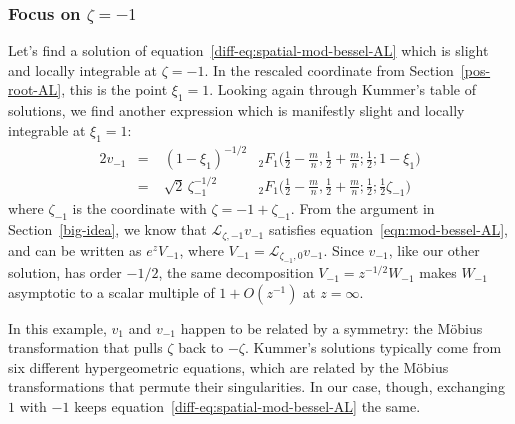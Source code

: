 \documentclass{article}
\theoremstyle{definition}
\newcommand{\laplace}{\mathcal{L}}
\begin{document}
\subsubsection{Focus on $\zeta = -1$}\label{neg-root-AL}
Let's find a solution of equation~\eqref{diff-eq:spatial-mod-bessel-AL} which is slight and locally integrable at $\zeta = -1$. In the rescaled coordinate from Section~\ref{pos-root-AL}, this is the point $\xi_1 = 1$. Looking again through Kummer's table of solutions, we find another expression \cite[formula~15.10.14]{dlmf} which is manifestly slight and locally integrable at $\xi_1 = 1$:
\begin{alignat*}{2}
v_{-1} &=\;& (1-\xi_1)^{-1/2} & {}_2F_1\big(\tfrac{1}{2}-\tfrac{m}{n}, \tfrac{1}{2}+\tfrac{m}{n}; \tfrac{1}{2}; 1-\xi_1\big) \\
&=\;& \sqrt{2}\,\zeta_{-1}^{-1/2} & {}_2F_1\big(\tfrac{1}{2}-\tfrac{m}{n}, \tfrac{1}{2}+\tfrac{m}{n}; \tfrac{1}{2}; \tfrac{1}{2}\zeta_{-1}\big)
\end{alignat*}
where $\zeta_{-1}$ is the coordinate with $\zeta = -1 + \zeta_{-1}$. From the argument in Section~\ref{big-idea}, we know that $\laplace_{\zeta, -1} v_{-1}$ satisfies equation~\eqref{eqn:mod-bessel-AL}, and can be written as $e^z V_{-1}$, where $V_{-1} = \laplace_{\zeta_{-1}, 0} v_{-1}$. Since $v_{-1}$, like our other solution, has order $-1/2$, the same decomposition $V_{-1} = z^{-1/2} W_{-1}$ makes $W_{-1}$ asymptotic to a scalar multiple of $1+O(z^{-1})$ at $z = \infty$.

In this example, $v_1$ and $v_{-1}$ happen to be related by a symmetry: the M\"{o}bius transformation that pulls $\zeta$ back to $-\zeta$. Kummer's solutions typically come from six different hypergeometric equations, which are related by the M\"{o}bius transformations that permute their singularities. In our case, though, exchanging $1$ with $-1$ keeps equation~\eqref{diff-eq:spatial-mod-bessel-AL} the same.
\end{document}
